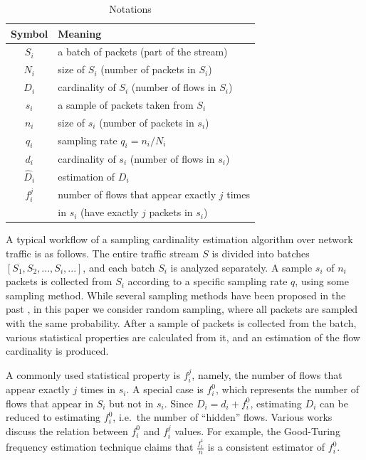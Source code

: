 		\begin{table}
			\centering
			\begin{tabular}{|c|l|} \hline
				\textbf{Symbol} & \textbf{Meaning}  \\\hline
				$S_i$ & a batch of packets (part of the stream)  \\\hline
				$N_i$ & size of $S_i$ (number of packets in $S_i$)\\\hline
				$D_i$ & cardinality of $S_i$ (number of flows in $S_i$)\\\hline
				$s_i$ & a sample of packets taken from $S_i$ \\\hline
				$n_i$ & size of $s_i$ (number of packets in $s_i$) \\\hline
				$q_i$ & sampling rate $q_i = n_i/N_i$ \\\hline
				$d_i$ & cardinality of $s_i$ (number of flows in $s_i$)\\\hline
				$\hat{D}_i$ & estimation of $D_i$ \\\hline
				$f_i^j$ & number of flows that appear exactly $j$ times\\& in $s_i$ (have exactly $j$ packets in $s_i$) \\\hline
			\end{tabular}
			\caption{Notations} 
			\label{table:notations}
		\end{table}
		
		A typical workflow of a sampling cardinality estimation algorithm over network traffic is as follows. The entire traffic stream $S$ is divided into batches $[S_1, S_2, ..., S_i, ...]$, and each batch $S_i$ is analyzed separately. A sample $s_i$ of $n_i$ packets is collected from $S_i$ according to a specific sampling rate $q$, using some sampling method. While several sampling methods have been proposed in the past \cite{einziger2017constant}, in this paper we consider random sampling, where all packets are sampled with the same probability. After a sample of packets is collected from the batch, various statistical properties are calculated from it, and an estimation of the flow cardinality is produced. 
		
		A commonly used statistical property is $f_i^j$, namely, the number of flows that appear exactly $j$ times in $s_i$. A special case is $f_i^0$, which represents the number of flows that appear in $S_i$ but not in $s_i$. Since $D_i=d_i+f_i^0$,  estimating $D_i$ can be reduced to estimating $f_i^0$, i.e.\, the number of ``hidden'' flows. Various works discuss the relation between $f_i^0$ and $f_i^j$ values. For example, the Good-Turing frequency estimation technique \cite{good1953population} claims that $\frac{f_i^1}{n}$ is a consistent estimator of $f_i^0$.

